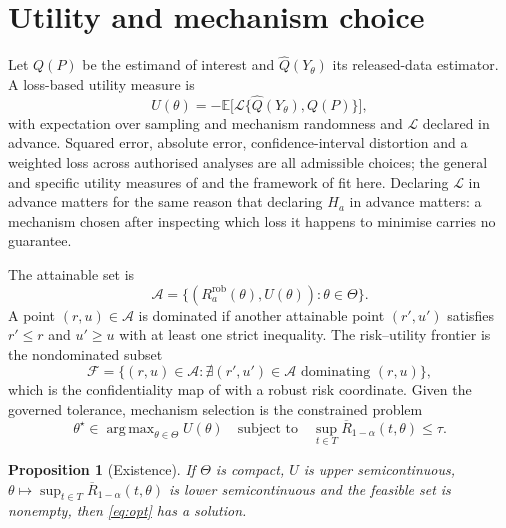 \documentclass[11pt,a4paper]{article}
\theoremstyle{plain}
\newtheorem{proposition}{Proposition}
\theoremstyle{definition}
\theoremstyle{definition}
\theoremstyle{plain}
\DeclareMathOperator*{\argmax}{arg\,max}
\newcommand{\E}{\mathbb{E}}
\begin{document}
\section{Utility and mechanism choice}\label{sec:ru}

Let $Q(P)$ be the estimand of interest and $\widehat{Q}(Y_\theta)$ its
released-data estimator. A loss-based utility measure is
\begin{equation}
U(\theta) = -\E\big[ \mathcal{L}\{\widehat{Q}(Y_\theta), Q(P)\} \big] ,
\label{eq:util}
\end{equation}
with expectation over sampling and mechanism randomness and $\mathcal{L}$
declared in advance. Squared error, absolute error, confidence-interval distortion and a
weighted loss across authorised analyses are all admissible choices; the
general and specific utility measures of \citet{snoke2018} and the framework of
\citet{karr2006} fit here. Declaring $\mathcal{L}$ in advance matters for the same reason
that declaring $H_a$ in advance matters: a mechanism chosen after inspecting
which loss it happens to minimise carries no guarantee.

The attainable set is
\begin{equation}
\mathcal{A} = \{(R_a^{\mathrm{rob}}(\theta), U(\theta)) : \theta \in \Theta\} .
\label{eq:attain}
\end{equation}
A point $(r, u) \in \mathcal{A}$ is dominated if another attainable point $(r', u')$
satisfies $r' \leq r$ and $u' \geq u$ with at least one strict inequality. The
risk--utility frontier is the nondominated subset
\begin{equation}
\mathcal{F} = \{(r, u) \in \mathcal{A} : \nexists (r', u') \in \mathcal{A} \text{ dominating } (r, u)\} ,
\label{eq:frontier}
\end{equation}
which is the confidentiality map of \citet{duncan2001} with a robust risk
coordinate. Given the governed tolerance, mechanism selection is the
constrained problem
\begin{equation}
\theta^\star \in \argmax_{\theta \in \Theta} U(\theta)
\quad \text{subject to} \quad \sup_{t \in T} \overline{R}_{1-\alpha}(t, \theta) \leq \tau .
\label{eq:opt}
\end{equation}

\begin{proposition}[Existence]\label{prop:exist}
If $\Theta$ is compact, $U$ is upper semicontinuous, $\theta \mapsto \sup_{t \in
T} \overline{R}_{1-\alpha}(t, \theta)$ is lower semicontinuous and the feasible set is
nonempty, then \eqref{eq:opt} has a solution.
\end{proposition}
\end{document}
